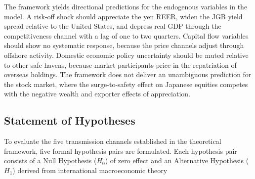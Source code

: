The framework yields directional predictions for the endogenous variables in the model. A risk-off shock should appreciate the yen REER, widen the JGB yield spread relative to the United States, and depress real GDP through the competitiveness channel with a lag of one to two quarters. Capital flow variables should show no systematic response, because the price channels adjust through offshore activity. Domestic economic policy uncertainty should be muted relative to other safe havens, because market participants price in the repatriation of overseas holdings. The framework does not deliver an unambiguous prediction for the stock market, where the surge-to-safety effect on Japanese equities competes with the negative wealth and exporter effects of appreciation.

\subsection{Statement of Hypotheses}

To evaluate the five transmission channels established in the theoretical framework, five formal hypothesis pairs are formulated. Each hypothesis pair consists of a Null Hypothesis ($H_{0}$) of zero effect and an Alternative Hypothesis ($H_{1}$) derived from international macroeconomic theory

